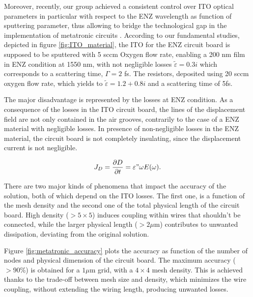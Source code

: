 \par Moreover, recently, our group achieved a consistent control over ITO optical parameters in particular with respect to the ENZ wavelength as function of sputtering parameter, thus allowing to bridge the technological gap in the implementation of metatronic circuits \cite{gui2018impact}. According to our fundamental studies, depicted in figure \ref{fig:ITO_material}, the ITO for the ENZ circuit board is supposed to be sputtered with 5 sccm Oxygen flow rate, enabling a 200 nm film in ENZ condition at 1550 nm, with not negligible losses $\widetilde{\varepsilon}= 0.3i$ which corresponds to a scattering time, $\Gamma= 2$ fs. The resistors, deposited using 20 sccm oxygen flow rate, which yields to $\widetilde{\varepsilon}=1.2+0.8i$  and a scattering time of 5fs. 

\par The major disadvantage is represented by the losses at ENZ condition. As a consequence of the losses in the ITO circuit board, the lines of the displacement field are not only contained in the air grooves, contrarily to the case of a ENZ material with negligible losses. In presence of non-negligible losses in the ENZ material, the circuit board is not completely insulating, since the displacement current is not negligible.

\begin{equation}
     J_D = \frac{\partial D}{\partial t}=\varepsilon"\omega E(\omega).
\end{equation}

\par There are two major kinds of phenomena that impact the accuracy of the solution, both of which depend on the ITO losses. The first one, is a function of the mesh density and the second one of the total physical length of the circuit board. High density ($>5\times5$) induces coupling within wires that shouldn't be connected, while the larger physical length ($>2\mu$m) contributes to unwanted dissipation, deviating from the original solution.

\par Figure \ref{fig:metatronic_accuracy} plots the accuracy as function of the number of nodes and physical dimension of the circuit board. The maximum accuracy ($>90$\%) is obtained for a $1\mu$m grid, with a $4\times4$ mesh density. This is achieved thanks to the trade-off between mesh size and density, which minimizes the wire coupling, without extending the wiring length, producing unwanted losses. 

